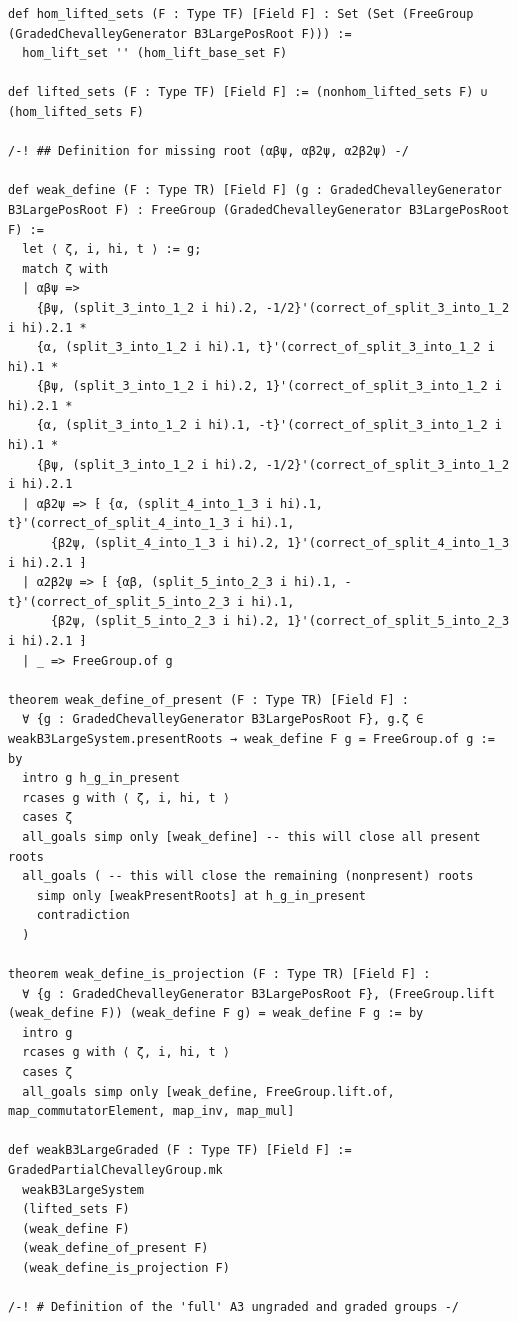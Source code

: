 \documentclass[10pt,a4paper]{article}
\begin{document}
\begin{Verbatim}
def hom_lifted_sets (F : Type TF) [Field F] : Set (Set (FreeGroup (GradedChevalleyGenerator B3LargePosRoot F))) :=
  hom_lift_set '' (hom_lift_base_set F)

def lifted_sets (F : Type TF) [Field F] := (nonhom_lifted_sets F) ∪ (hom_lifted_sets F)

/-! ## Definition for missing root (αβψ, αβ2ψ, α2β2ψ) -/

def weak_define (F : Type TR) [Field F] (g : GradedChevalleyGenerator B3LargePosRoot F) : FreeGroup (GradedChevalleyGenerator B3LargePosRoot F) :=
  let ⟨ ζ, i, hi, t ⟩ := g;
  match ζ with
  | αβψ =>
    {βψ, (split_3_into_1_2 i hi).2, -1/2}'(correct_of_split_3_into_1_2 i hi).2.1 *
    {α, (split_3_into_1_2 i hi).1, t}'(correct_of_split_3_into_1_2 i hi).1 *
    {βψ, (split_3_into_1_2 i hi).2, 1}'(correct_of_split_3_into_1_2 i hi).2.1 *
    {α, (split_3_into_1_2 i hi).1, -t}'(correct_of_split_3_into_1_2 i hi).1 *
    {βψ, (split_3_into_1_2 i hi).2, -1/2}'(correct_of_split_3_into_1_2 i hi).2.1
  | αβ2ψ => ⁅ {α, (split_4_into_1_3 i hi).1, t}'(correct_of_split_4_into_1_3 i hi).1,
      {β2ψ, (split_4_into_1_3 i hi).2, 1}'(correct_of_split_4_into_1_3 i hi).2.1 ⁆
  | α2β2ψ => ⁅ {αβ, (split_5_into_2_3 i hi).1, -t}'(correct_of_split_5_into_2_3 i hi).1,
      {β2ψ, (split_5_into_2_3 i hi).2, 1}'(correct_of_split_5_into_2_3 i hi).2.1 ⁆
  | _ => FreeGroup.of g

theorem weak_define_of_present (F : Type TR) [Field F] :
  ∀ {g : GradedChevalleyGenerator B3LargePosRoot F}, g.ζ ∈ weakB3LargeSystem.presentRoots → weak_define F g = FreeGroup.of g := by
  intro g h_g_in_present
  rcases g with ⟨ ζ, i, hi, t ⟩
  cases ζ
  all_goals simp only [weak_define] -- this will close all present roots
  all_goals ( -- this will close the remaining (nonpresent) roots
    simp only [weakPresentRoots] at h_g_in_present
    contradiction
  )

theorem weak_define_is_projection (F : Type TR) [Field F] :
  ∀ {g : GradedChevalleyGenerator B3LargePosRoot F}, (FreeGroup.lift (weak_define F)) (weak_define F g) = weak_define F g := by
  intro g
  rcases g with ⟨ ζ, i, hi, t ⟩
  cases ζ
  all_goals simp only [weak_define, FreeGroup.lift.of, map_commutatorElement, map_inv, map_mul]

def weakB3LargeGraded (F : Type TF) [Field F] := GradedPartialChevalleyGroup.mk
  weakB3LargeSystem
  (lifted_sets F)
  (weak_define F)
  (weak_define_of_present F)
  (weak_define_is_projection F)

/-! # Definition of the 'full' A3 ungraded and graded groups -/


\end{Verbatim}
\end{document}

